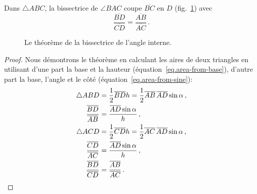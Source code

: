 \begin{theorem}\label{thm.angle-bisector}
Dans $\triangle ABC$, la bissectrice de $\angle BAC$ coupe $\overline{BC}$ en $D$  (fig.~\ref{f.angle-bisector}) avec
\[
\frac {\overline{BD}}{\overline{CD}}=\frac {\overline{AB}}{\overline{AC}}\,.
\]
\end{theorem}

\begin{figure}[htbp]
\centering

\caption{Le théorème de la bissectrice de l'angle interne.}\label{f.angle-bisector}
\end{figure}
\begin{proof}
Nous démontrons le théorème en calculant les aires de deux triangles en utilisant d'une part  la base et la hauteur (équation~\ref{eq.area-from-base}), d'autre part la base, l'angle et le côté (équation~\ref{eq.area-from-sine}):
\begin{align*}
\triangle ABD&=\frac{1}{2}\overline{BD}h=\frac{1}{2}\overline{AB}\,\overline{AD}\sin \alpha\,,\\
\frac{\overline{BD}}{\overline{AB}}&=\frac{\overline{AD}\sin \alpha}{h}\,,\\
\triangle ACD&=\frac{1}{2}\overline{CD}h=\frac{1}{2}\overline{AC}\,\overline{AD}\sin \alpha\,,\\
\frac{\overline{CD}}{\overline{AC}}&=\frac{\overline{AD}\sin \alpha}{h}\,,\\
\frac{\overline{BD}}{\overline{CD}}&=\frac{\overline{AB}}{\overline{AC}}\,.\qedhere
\end{align*}
\end{proof}

